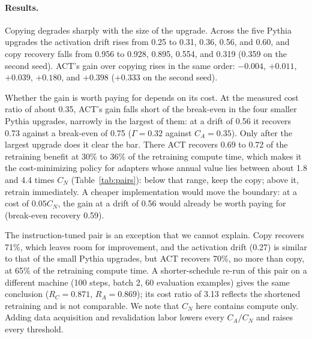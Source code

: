 \documentclass[preprint,12pt,authoryear]{elsarticle}
\begin{document}
\paragraph{Results.} Copying degrades sharply with the size of the upgrade. Across the five Pythia upgrades the activation drift rises from 0.25 to 0.31, 0.36, 0.56, and 0.60, and
copy recovery falls from 0.956 to 0.928, 0.895, 0.554, and 0.319 (0.359 on the second seed). ACT's gain over copying rises in the same order: $-0.004$, $+0.011$, $+0.039$, $+0.180$, and $+0.398$ ($+0.333$ on the second seed).

Whether the gain is worth paying for depends on its cost. At the measured cost ratio of about 0.35, ACT's gain falls short of the break-even in the four smaller Pythia upgrades, narrowly in the largest of them: at a drift of 0.56 it recovers 0.73 against a break-even of 0.75 ($\Gamma=0.32$ against $C_A=0.35$).
Only after the largest upgrade does it clear the bar. There ACT recovers 0.69 to 0.72 of the retraining benefit at 30\% to 36\% of the retraining compute time, which makes it the cost-minimizing policy for adapters
whose annual value lies between about 1.8 and 4.4 times $C_N$ (Table~\ref{tab:pairs}): below that range, keep the copy; above it, retrain immediately. A cheaper implementation would move the boundary: at a cost of $0.05C_N$, the gain at a drift of 0.56 would already be worth paying for (break-even recovery 0.59).

The instruction-tuned pair is an exception that we cannot explain. Copy recovers 71\%, which leaves room for improvement, and the activation drift (0.27) is similar to that of the small Pythia upgrades, but ACT recovers 70\%, no more than copy, at 65\% of the retraining compute time.
A shorter-schedule re-run of this pair on a different machine (100 steps, batch 2, 60 evaluation examples) gives the same conclusion ($R_C=0.871$, $R_A=0.869$); its cost ratio of 3.13 reflects the shortened retraining and is not comparable.
We note that $C_N$ here contains compute only. Adding data acquisition and revalidation labor lowers every $C_A/C_N$ and raises every threshold.
\end{document}
